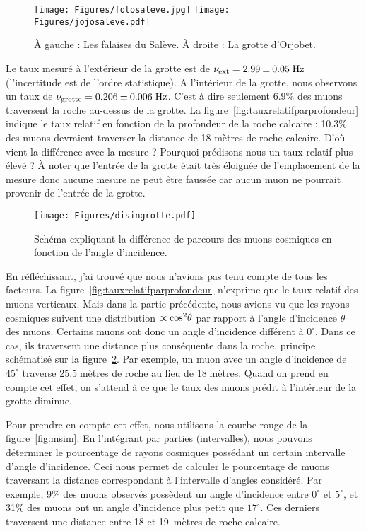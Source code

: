 \documentclass[a4paper, 12pt]{article}
\begin{document}
\begin{spacing}{1.5}
\begin{figure}[t]
\begin{center}
  \texttt{[image: Figures/fotosaleve.jpg]}
  \texttt{[image: Figures/jojosaleve.pdf]}
\caption{\label{fig:GrotteOrjobet} À gauche : Les falaises du Salève. À droite : La grotte d'Orjobet.}
\end{center}
\end{figure}

Le taux mesuré à l'extérieur de la grotte est de $\nu_{\rm ext}=2.99\pm0.05\;{\rm Hz}$ (l'incertitude est de l'ordre statistique). A l'intérieur de la grotte, nous observons un taux de $\nu_{\rm grotte}=0.206\pm0.006\;{\rm Hz}$. C'est à dire seulement 6.9\% des muons traversent la roche au-dessus de la grotte. La figure~\ref{fig:tauxrelatifparprofondeur} indique le taux relatif en fonction de la profondeur de la roche calcaire : 10.3\% des muons devraient traverser la distance de 18 mètres de roche calcaire. D'où vient la différence avec la mesure ? Pourquoi prédisons-nous un taux relatif plus élevé ? À noter que l'entrée de la grotte était très éloignée de l'emplacement de la mesure donc aucune mesure ne peut être faussée car aucun muon ne pourrait provenir de l'entrée de la grotte.

\begin{figure}[t]
\begin{center}
\texttt{[image: Figures/disingrotte.pdf]}
\caption{\label{fig:disingrotte} Schéma expliquant la différence de parcours des muons cosmiques en fonction de l'angle d'incidence.}
\end{center}
\end{figure}
En réfléchissant, j'ai trouvé que nous n'avions pas tenu compte de tous les facteurs. La figure~\ref{fig:tauxrelatifparprofondeur} n'exprime que le taux relatif des muons verticaux. Mais dans la partie précédente, nous avions vu que les rayons cosmiques suivent une distribution $\propto {\rm cos}^2\theta$ par rapport à l'angle d'incidence $\theta$ des muons.  Certains muons ont donc un angle d'incidence différent à $0^{\circ}$. Dans ce cas, ils traversent une distance plus conséquente dans la roche, principe schématisé sur la figure~\ref{fig:disingrotte}. Par exemple, un muon avec un angle d'incidence de $45^\circ$ traverse 25.5$\;$mètres de roche au lieu de 18$\;$mètres. Quand on prend en compte cet effet, on s'attend à ce que le taux des muons prédit à l'intérieur de la grotte diminue. 

Pour prendre en compte cet effet, nous utilisons la courbe rouge de la figure~\ref{fig:msim}. En l'intégrant par parties (intervalles), nous pouvons déterminer le pourcentage de rayons cosmiques possédant un certain intervalle d'angle d'incidence. Ceci nous permet de calculer le pourcentage de muons traversant la distance correspondant à l'intervalle d'angles considéré. Par exemple, 9\% des muons observés possèdent un angle d'incidence entre $0^\circ$ et $5^\circ$, et 31\% des muons ont un angle d'incidence plus petit que $17^\circ$. Ces derniers traversent une distance entre 18 et 19~mètres de roche calcaire. 


\end{spacing}
\end{document}
